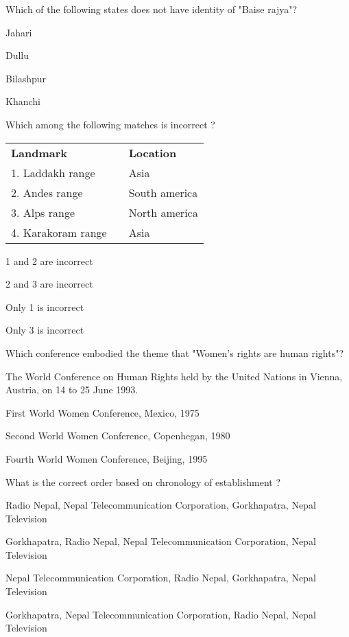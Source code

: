 \begin{questions}
\begin{solution}
\end{solution}

\question Which of the following states does not have identity of "Baise rajya"?
  \begin{items}
  \item Jahari
  \item Dullu
  \item Bilashpur
  \item* Khanchi
  \end{items}

\question Which among the following matches is incorrect ?
  \begin{table}[h]
  \centering
  \begin{tabular}{lll}
    \textbf{Landmark} & & \textbf{Location} \\[2mm]
    1. Laddakh range & & Asia \\
    2. Andes range & & South america \\
    3. Alps range & & North america \\
    4. Karakoram range & & Asia \\
  \end{tabular}
  \end{table}
  \begin{items}
  \item 1 and 2 are incorrect
  \item 2 and 3 are incorrect
  \item Only 1 is incorrect
  \item* Only 3 is incorrect
  \end{items}

\question Which conference embodied the theme that "Women's rights are human rights"?
  \begin{items}
  \item The World Conference on Human Rights held by the United Nations in Vienna, Austria, on 14 to 25 June 1993.
  \item First World Women Conference, Mexico, 1975
  \item Second World Women Conference, Copenhegan, 1980
  \item Fourth World Women Conference, Beijing, 1995
  \end{items}

\question What is the correct order based on chronology of establishment ?
  \begin{items}
  \item Radio Nepal, Nepal Telecommunication Corporation, Gorkhapatra, Nepal Television
  \item* Gorkhapatra, Radio Nepal, Nepal Telecommunication Corporation, Nepal Television
  \item Nepal Telecommunication Corporation, Radio Nepal, Gorkhapatra, Nepal Television
  \item Gorkhapatra, Nepal Telecommunication Corporation, Radio Nepal, Nepal Television
  \end{items}


\end{questions}
